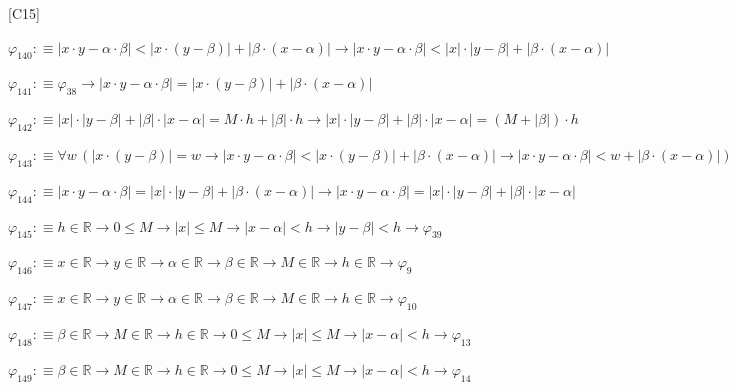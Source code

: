 \begin{fullproof}{[C15]}
\begin{abbrevlist}
\item $\varphi_{140} :\equiv \lvert x \cdot y - \alpha \cdot \beta \rvert < \lvert x \cdot (y - \beta) \rvert + \lvert \beta \cdot (x - \alpha) \rvert \to \lvert x \cdot y - \alpha \cdot \beta \rvert < \lvert x \rvert \cdot \lvert y - \beta \rvert + \lvert \beta \cdot (x - \alpha) \rvert$
\item $\varphi_{141} :\equiv \varphi_{38} \to \lvert x \cdot y - \alpha \cdot \beta \rvert = \lvert x \cdot (y - \beta) \rvert + \lvert \beta \cdot (x - \alpha) \rvert$
\item $\varphi_{142} :\equiv \lvert x \rvert \cdot \lvert y - \beta \rvert + \lvert \beta \rvert \cdot \lvert x - \alpha \rvert = M \cdot h + \lvert \beta \rvert \cdot h \to \lvert x \rvert \cdot \lvert y - \beta \rvert + \lvert \beta \rvert \cdot \lvert x - \alpha \rvert = (M + \lvert \beta \rvert) \cdot h$
\item $\varphi_{143} :\equiv \forall w\,(\lvert x \cdot (y - \beta) \rvert = w \to \lvert x \cdot y - \alpha \cdot \beta \rvert < \lvert x \cdot (y - \beta) \rvert + \lvert \beta \cdot (x - \alpha) \rvert \to \lvert x \cdot y - \alpha \cdot \beta \rvert < w + \lvert \beta \cdot (x - \alpha) \rvert)$
\item $\varphi_{144} :\equiv \lvert x \cdot y - \alpha \cdot \beta \rvert = \lvert x \rvert \cdot \lvert y - \beta \rvert + \lvert \beta \cdot (x - \alpha) \rvert \to \lvert x \cdot y - \alpha \cdot \beta \rvert = \lvert x \rvert \cdot \lvert y - \beta \rvert + \lvert \beta \rvert \cdot \lvert x - \alpha \rvert$
\item $\varphi_{145} :\equiv h \in \mathbb{R} \to 0 \leq M \to \lvert x \rvert \leq M \to \lvert x - \alpha \rvert < h \to \lvert y - \beta \rvert < h \to \varphi_{39}$
\item $\varphi_{146} :\equiv x \in \mathbb{R} \to y \in \mathbb{R} \to \alpha \in \mathbb{R} \to \beta \in \mathbb{R} \to M \in \mathbb{R} \to h \in \mathbb{R} \to \varphi_{9}$
\item $\varphi_{147} :\equiv x \in \mathbb{R} \to y \in \mathbb{R} \to \alpha \in \mathbb{R} \to \beta \in \mathbb{R} \to M \in \mathbb{R} \to h \in \mathbb{R} \to \varphi_{10}$
\item $\varphi_{148} :\equiv \beta \in \mathbb{R} \to M \in \mathbb{R} \to h \in \mathbb{R} \to 0 \leq M \to \lvert x \rvert \leq M \to \lvert x - \alpha \rvert < h \to \varphi_{13}$
\item $\varphi_{149} :\equiv \beta \in \mathbb{R} \to M \in \mathbb{R} \to h \in \mathbb{R} \to 0 \leq M \to \lvert x \rvert \leq M \to \lvert x - \alpha \rvert < h \to \varphi_{14}$

\end{abbrevlist}
\end{fullproof}
